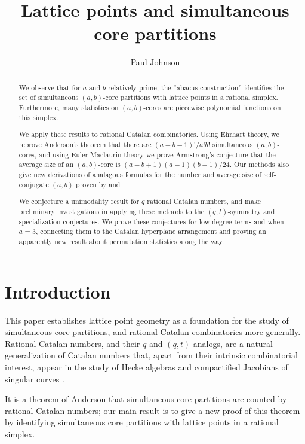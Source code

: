 \documentclass{amsart}[12pt]
\theoremstyle{definition}
\begin{document}
\title{Lattice points and simultaneous core partitions}
\begin{abstract}
We observe that for $a$ and $b$ relatively prime, the ``abacus construction'' identifies the set of simultaneous $(a,b)$-core partitions with lattice points in a rational simplex. Furthermore, many statistics on $(a,b)$-cores are piecewise polynomial functions on this simplex.  

We apply these results to rational Catalan combinatorics.  Using Ehrhart theory, we reprove Anderson's theorem \cite{anderson} that there are $(a+b-1)!/a!b!$ simultaneous $(a,b)$-cores, and using Euler-Maclaurin theory we prove Armstrong's conjecture \cite{AHJ} that the average size of an $(a,b)$-core is $(a+b+1)(a-1)(b-1)/24$.  Our methods also give new derivations of analagous formulas for the number and average size of self-conjugate $(a,b)$ proven by \cite{FMS} and \cite{CHW} 

We conjecture a unimodality result for $q$ rational Catalan numbers, and make preliminary investigations in applying these methods to the $(q,t)$-symmetry and specialization conjectures.  We prove these conjectures for low degree terms and when $a=3$, connecting them to the Catalan hyperplane arrangement and proving an apparently new result about permutation statistics along the way.

\end{abstract}


\author{Paul Johnson}
\date{}
\maketitle
\section{Introduction}
This paper establishes lattice point geometry as a foundation for the study of simultaneous core partitions, and rational Catalan combinatorics more generally.  Rational Catalan numbers, and their $q$ and $(q,t)$ analogs, are a natural generalization of Catalan numbers that, apart from their intrinsic combinatorial interest, appear in the study of Hecke algebras \cite{GG} and compactified Jacobians of singular curves \cite{EM1, EM2}.  

It is a theorem of Anderson that simultaneous core partitions are counted by rational Catalan numbers; our main result is to give a new proof of this theorem by identifying simultaneous core partitions with lattice points in a rational simplex.
\end{document}
